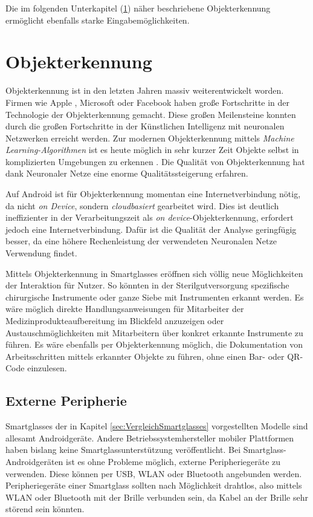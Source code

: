 Die im folgenden Unterkapitel (\ref{sec:Objekterkennung}) näher beschriebene Objekterkennung ermöglicht ebenfalls starke Eingabemöglichkeiten.
%
%
%
%
%
%
\section{Objekterkennung}
\label{sec:Objekterkennung}
Objekterkennung ist in den letzten Jahren massiv weiterentwickelt worden. Firmen wie Apple \cite{Apple2018b}, Microsoft \cite{Girshick2015} oder Facebook \cite{Schroepfer2015} haben große Fortschritte in der Technologie der Objekterkennung gemacht. Diese großen Meilensteine konnten durch die großen Fortschritte in der Künstlichen Intelligenz mit neuronalen Netzwerken \cite{Apple2018b, Schroepfer2015} erreicht werden. Zur modernen Objekterkennung mittels \emph{Machine Learning-Algorithmen} ist es heute möglich in sehr kurzer Zeit Objekte selbst in komplizierten Umgebungen zu erkennen \cite{Schroepfer2015}. 
Die Qualität von Objekterkennung hat dank Neuronaler Netze eine enorme Qualitätssteigerung erfahren.

Auf Android ist für Objekterkennung momentan eine Internetverbindung nötig, da nicht \emph{on Device}, sondern \emph{cloudbasiert} gearbeitet wird. Dies ist deutlich ineffizienter in der Verarbeitungszeit als \emph{on device}-Objekterkennung, erfordert jedoch eine Internetverbindung. Dafür ist die Qualität der Analyse geringfügig besser, da eine höhere Rechenleistung der verwendeten Neuronalen Netze Verwendung findet.

Mittels Objekterkennung in Smartglasses eröffnen sich völlig neue Möglichkeiten der Interaktion für Nutzer. So könnten in der Sterilgutversorgung spezifische chirurgische Instrumente oder ganze Siebe mit Instrumenten erkannt werden. Es wäre möglich direkte Handlungsanweisungen für Mitarbeiter der Medizinprodukteaufbereitung im Blickfeld anzuzeigen oder Austauschmöglichkeiten mit Mitarbeitern über konkret erkannte Instrumente zu führen. Es wäre ebenfalls per Objekterkennung möglich, die Dokumentation von Arbeitsschritten mittels erkannter Objekte zu führen, ohne einen Bar- oder QR-Code einzulesen.
%
%
%
%
%
%
\subsection{Externe Peripherie}
\label{sec:Externe_Peripherie}
Smartglasses der in Kapitel \ref{sec:VergleichSmartglasses} vorgestellten Modelle sind allesamt Androidgeräte. Andere Betriebssystemhersteller mobiler Plattformen haben bislang keine Smartglassunterstützung veröffentlicht. Bei Smartglass-Androidgeräten ist es ohne Probleme möglich, externe Peripheriegeräte zu verwenden. Diese können per USB, WLAN oder Bluetooth angebunden werden.  Peripheriegeräte einer Smartglass sollten nach Möglichkeit drahtlos, also mittels WLAN oder Bluetooth mit der Brille verbunden sein, da Kabel an der Brille sehr störend sein könnten. 

